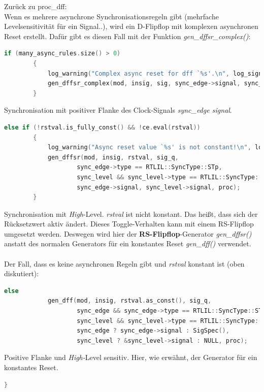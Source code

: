 \documentclass[11pt]{report}
\begin{document}
\begin{enumerate}
Zurück zu proc\_dff:\\
Wenn es mehrere asynchrone Synchronisationsregeln gibt (mehrfache Levelsensitivität für ein Signal..), wird ein D-Flipflop mit komplexen asynchronen Reset erstellt. Dafür gibt es diesen Fall mit der Funktion \textit{gen\_dffsr\_complex()}:
\begin{lstlisting}[language=C++]
		if (many_async_rules.size() > 0)
		{
			log_warning("Complex async reset for dff `%s'.\n", log_signal(sig));
			gen_dffsr_complex(mod, insig, sig, sync_edge->signal, sync_edge->type == RTLIL::SyncType::STp, many_async_rules, proc);
		}
\end{lstlisting}
Synchronisation mit positiver Flanke des Clock-Signals \textit{sync\_edge signal}.



\begin{lstlisting}[language=C++]
else if (!rstval.is_fully_const() && !ce.eval(rstval))
		{
			log_warning("Async reset value `%s' is not constant!\n", log_signal(rstval));
			gen_dffsr(mod, insig, rstval, sig_q,
					sync_edge->type == RTLIL::SyncType::STp,
					sync_level && sync_level->type == RTLIL::SyncType::ST1,
					sync_edge->signal, sync_level->signal, proc);
		}
\end{lstlisting}
Synchronisation mit \textit{High}-Level. \textit{rstval} ist nicht konstant. Das heißt, dass sich der Rücksetzwert aktiv ändert. Dieses Toggle-Verhalten kann mit einem RS-Flipflop umgesetzt werden. Deswegen wird hier der \textbf{RS-Flipflop}-Generator \textit{gen\_dffsr()} anstatt des normalen Generators für ein konstantes Reset \textit{gen\_dff()} verwendet.
\\
\\
Der Fall, dass es keine asynchronen Regeln gibt und \textit{rstval} konstant ist (oben diskutiert):
\begin{lstlisting}[language=C++]
else
			gen_dff(mod, insig, rstval.as_const(), sig_q,
					sync_edge && sync_edge->type == RTLIL::SyncType::STp,
					sync_level && sync_level->type == RTLIL::SyncType::ST1,
					sync_edge ? sync_edge->signal : SigSpec(),
					sync_level ? &sync_level->signal : NULL, proc);

\end{lstlisting}
Positive Flanke und \textit{High-}Level sensitiv. Hier, wie erwähnt, der Generator für ein konstantes Reset.

\begin{lstlisting}[language=C++]
}


\end{lstlisting}
\end{enumerate}
\end{document}
